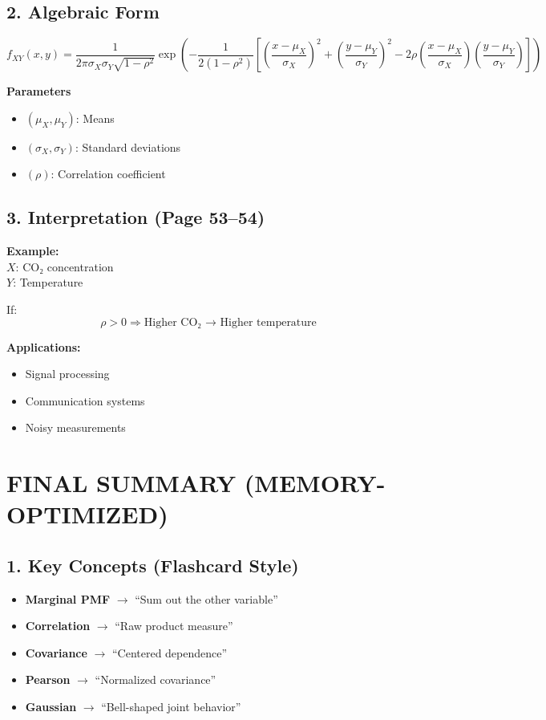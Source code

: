 \documentclass[11pt]{article}
\begin{document}
\subsection*{2. Algebraic Form}
\[
f_{XY}(x,y)=\frac{1}{2\pi\sigma_X\sigma_Y\sqrt{1-\rho^2}}
\exp\left(
-\frac{1}{2(1-\rho^2)}\left[
\left(\frac{x-\mu_X}{\sigma_X}\right)^2
+
\left(\frac{y-\mu_Y}{\sigma_Y}\right)^2
-2\rho\left(\frac{x-\mu_X}{\sigma_X}\right)\left(\frac{y-\mu_Y}{\sigma_Y}\right)
\right]
\right)
\]

\noindent\textbf{Parameters}
\begin{itemize}
    \item $(\mu_X, \mu_Y)$: Means
    \item $(\sigma_X, \sigma_Y)$: Standard deviations
    \item $(\rho)$: Correlation coefficient
\end{itemize}

\subsection*{3. Interpretation (Page 53–54)}
\noindent\textbf{Example:}\\
$X$: CO₂ concentration\\
$Y$: Temperature

\noindent If:
\[
\rho > 0 \Rightarrow \text{Higher CO₂ → Higher temperature}
\]

\noindent\textbf{Applications:}
\begin{itemize}
    \item Signal processing
    \item Communication systems
    \item Noisy measurements
\end{itemize}

\newpage

\section*{FINAL SUMMARY (MEMORY-OPTIMIZED)}

\subsection*{1. Key Concepts (Flashcard Style)}
\begin{itemize}
    \item \textbf{Marginal PMF} $\rightarrow$ “Sum out the other variable”
    \item \textbf{Correlation} $\rightarrow$ “Raw product measure”
    \item \textbf{Covariance} $\rightarrow$ “Centered dependence”
    \item \textbf{Pearson} $\rightarrow$ “Normalized covariance”
    \item \textbf{Gaussian} $\rightarrow$ “Bell-shaped joint behavior”
\end{itemize}
\end{document}
